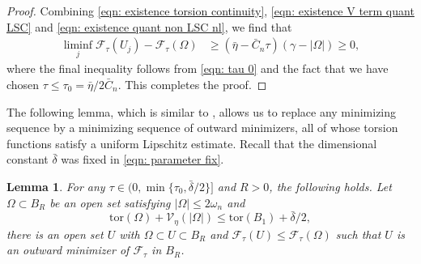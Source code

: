 \documentclass[10pt, reqno]{amsart}
\numberwithin{equation}{section}
\newtheorem{lemma}[theorem]{Lemma}
\def\W{\Omega}
\def\tor{\mathrm{tor}}
\def\vpar{\eta}
\def\fv{\mathscr{V}_{\vpar}}
\def\err{\tau}
\def\Ep{\mathcal{F}_{\err}}
\def\ccdel{\bar{\delta}}
\begin{document}
\begin{proof}
 Combining \eqref{eqn: existence torsion continuity}, \eqref{eqn: existence V term quant  LSC} and \eqref{eqn: existence quant non LSC nl}, we find that 
 	\begin{align*}
 		\liminf_j \Ep(U_j)- \Ep(\W)
 		& \geq (\bar\eta- \bar{C}_n\tau)(\gamma - |\W|) \geq 0,
 	\end{align*}
  where the final inequality follows from \eqref{eqn: tau 0} and the fact that we have chosen $\tau \leq \tau_0= {\bar\eta}/2\bar{C}_n$.
This completes the proof.     
 \end{proof}

The following lemma, which is similar to \cite[Lemma 6.1]{AKN1}, allows us to replace any minimizing sequence by a minimizing sequence of outward minimizers, all of whose torsion functions satisfy a uniform Lipschitz estimate.
Recall that the dimensional constant $\bar{\delta}$ was fixed in \eqref{eqn: parameter fix}.
%
%
%
%
%
\begin{lemma}\label{lemma: replace outer}
 For any $\tau \in (0, \min\{ \tau_0, \ccdel/2\}]$  and $R> 0$, the following holds. 
	 Let $\Omega\subset B_R$ be an open set  satisfying $|\Omega|\leq 2 \omega_n$ and
	\begin{equation}
		\label{eqn: small base energy existence section}
	\tor(\W) + \fv(|\W|) \leq \tor(B_1) + \bar{\delta}/2,
		\end{equation}
	there is an open set $U$ with $\W\subset U \subset B_R$ and $\Ep(U) \leq \Ep(\W)$ such that $U$ is an outward minimizer of $\Ep$ in $B_R$.
\end{lemma}
%
%
%
%
%
\end{document}
